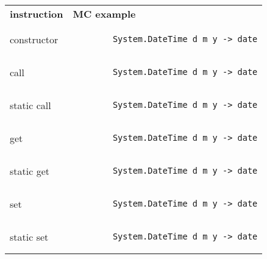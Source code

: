 \begin{tabular}{ll}
    \textbf{instruction} & \textbf{MC example}\\
    constructor & \begin{lstlisting}
        System.DateTime d m y -> date
    \end{lstlisting}\\
    call & \begin{lstlisting}
        System.DateTime d m y -> date
    \end{lstlisting}\\
    static call & \begin{lstlisting}
        System.DateTime d m y -> date
    \end{lstlisting}\\
    get & \begin{lstlisting}
        System.DateTime d m y -> date
    \end{lstlisting}\\
    static get & \begin{lstlisting}
        System.DateTime d m y -> date
    \end{lstlisting}\\
    set & \begin{lstlisting}
        System.DateTime d m y -> date
    \end{lstlisting}\\
    static set & \begin{lstlisting}
        System.DateTime d m y -> date
    \end{lstlisting}\\
\end{tabular}
